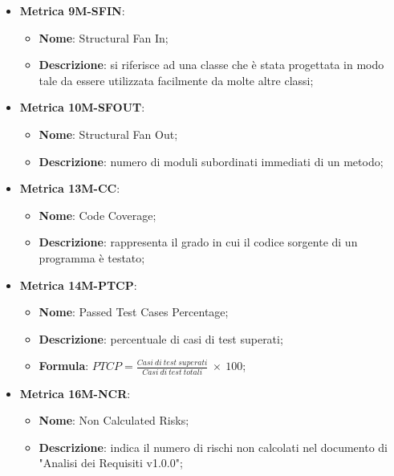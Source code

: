 \begin{itemize}
    \item \textbf{Metrica 9M-SFIN}:
    \begin{itemize}
        \item \textbf{Nome}: Structural Fan In;
        \item \textbf{Descrizione}: si riferisce ad una classe che è stata progettata in modo tale da essere utilizzata facilmente da molte altre classi;
    \end{itemize}
\end{itemize}

\begin{itemize}
    \item \textbf{Metrica 10M-SFOUT}:
    \begin{itemize}
        \item \textbf{Nome}: Structural Fan Out;
        \item \textbf{Descrizione}: numero di moduli subordinati immediati di un metodo;
    \end{itemize}
\end{itemize}



\begin{itemize}
    \item \textbf{Metrica 13M-CC}:
    \begin{itemize}
        \item \textbf{Nome}: Code Coverage;
        \item \textbf{Descrizione}: rappresenta il grado in cui il codice sorgente di un programma è testato;
    \end{itemize}
\end{itemize}

\begin{itemize}
    \item \textbf{Metrica 14M-PTCP}:
    \begin{itemize}
        \item \textbf{Nome}: Passed Test Cases Percentage;
        \item \textbf{Descrizione}: percentuale di casi di test superati;
        \item \textbf{Formula}: $PTCP = \frac{Casi\: di\: test\: superati}{Casi\: di\: test\: totali}\: \times \: 100$;
    \end{itemize}
\end{itemize}

\begin{itemize}
    \item \textbf{Metrica 16M-NCR}:
    \begin{itemize}
        \item \textbf{Nome}: Non Calculated Risks;
        \item \textbf{Descrizione}: indica il numero di rischi non calcolati nel documento di "Analisi dei Requisiti v1.0.0";
    \end{itemize}
\end{itemize}

